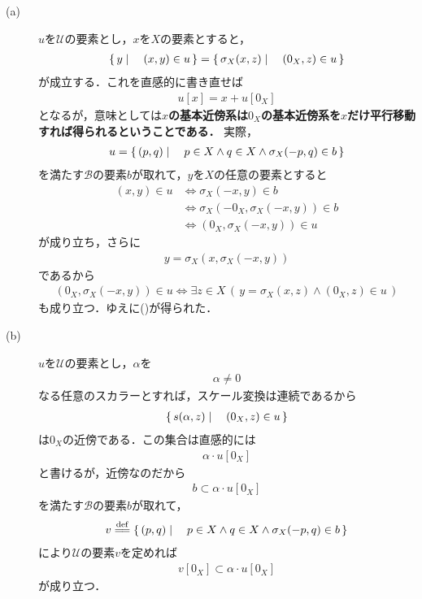 	\begin{description}
		\item[(a)] $u$を$\mathscr{U}$の要素とし，$x$を$X$の要素とすると，
			\begin{align}
				\left\{\, y \mid \quad (x,y) \in u\, \right\} = \left\{\, \sigma_X(x,z) \mid \quad (0_X,z) \in u\, \right\}
				\label{fom:pre_thm_entourages_introducing_vector_topology_1}
			\end{align}
			が成立する．これを直感的に書き直せば
			\begin{align}
				u[x] = x + u[0_X]
			\end{align}
			となるが，意味としては{\bf $x$の基本近傍系は$0_X$の基本近傍系を$x$だけ平行移動すれば得られるということである．}
			実際，
			\begin{align}
				u = \left\{\, (p,q) \mid \quad p \in X \wedge q \in X \wedge \sigma_X(-p,q) \in b\, \right\}
			\end{align}
			を満たす$\mathscr{B}$の要素$b$が取れて，$y$を$X$の任意の要素とすると
			\begin{align}
				(x,y) \in u &\Longleftrightarrow \sigma_X\left(-x,y\right) \in b \\
				&\Longleftrightarrow \sigma_X\left(-0_X,\sigma_X\left(-x,y\right)\right) \in b \\
				&\Longleftrightarrow \left(0_X,\sigma_X\left(-x,y\right)\right) \in u
			\end{align}
			が成り立ち，さらに
			\begin{align}
				y = \sigma_X\left(x,\sigma_X\left(-x,y\right)\right)
			\end{align}
			であるから
			\begin{align}
				\left(0_X,\sigma_X\left(-x,y\right)\right) \in u
				\Longleftrightarrow \exists z \in X\, \left(\, y=\sigma_X\left(x,z\right) 
				\wedge \left(0_X,z\right) \in u\, \right)
			\end{align}
			も成り立つ．ゆえに()が得られた．
		
		\item[(b)] $u$を$\mathscr{U}$の要素とし，$\alpha$を
			\begin{align}
				\alpha \neq 0
			\end{align}
			なる任意のスカラーとすれば，スケール変換は連続であるから
			\begin{align}
				\left\{\, s(\alpha,z) \mid \quad (0_X,z) \in u\, \right\}
			\end{align}
			は$0_X$の近傍である．この集合は直感的には
			\begin{align}
				\alpha \cdot u[0_X]
			\end{align}
			と書けるが，近傍なのだから
			\begin{align}
				b \subset \alpha \cdot u[0_X]
			\end{align}
			を満たす$\mathscr{B}$の要素$b$が取れて，
			\begin{align}
				v \defeq \Set{(p,q)}{p \in X \wedge q \in X \wedge \sigma_X(-p,q) \in b}
			\end{align}
			により$\mathscr{U}$の要素$v$を定めれば
			\begin{align}
				v[0_X] \subset \alpha \cdot u[0_X]
			\end{align}
			が成り立つ．
			

\end{description}
